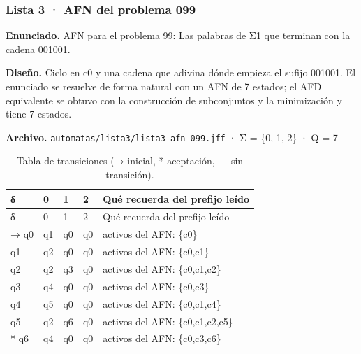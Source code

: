 
\hypertarget{lista-3-afn-del-problema-099}{%
\subsubsection{Lista 3 · AFN del problema 099}\label{lista-3-afn-del-problema-099}}

\textbf{Enunciado.} AFN para el problema 99: Las palabras de Σ1 que terminan con la cadena 001001.

\textbf{Diseño.} Ciclo en c0 y una cadena que adivina dónde empieza el sufijo 001001. El enunciado se resuelve de forma natural con un AFN de 7 estados; el AFD equivalente se obtuvo con la construcción de subconjuntos y la minimización y tiene 7 estados.

\textbf{Archivo.} \texttt{automatas/lista3/lista3-afn-099.jff} · Σ = \{0, 1, 2\} · \textbar Q\textbar{} = 7

\begin{longtable}[]{@{}lllll@{}}
\caption{Tabla de transiciones (→ inicial, * aceptación, --- sin transición).}\tabularnewline
\toprule\noalign{}
δ & 0 & 1 & 2 & Qué recuerda del prefijo leído \\
\midrule\noalign{}
\endfirsthead
\toprule\noalign{}
δ & 0 & 1 & 2 & Qué recuerda del prefijo leído \\
\midrule\noalign{}
\endhead
\bottomrule\noalign{}
\endlastfoot
→ q0 & q1 & q0 & q0 & activos del AFN: \{c0\} \\
q1 & q2 & q0 & q0 & activos del AFN: \{c0,c1\} \\
q2 & q2 & q3 & q0 & activos del AFN: \{c0,c1,c2\} \\
q3 & q4 & q0 & q0 & activos del AFN: \{c0,c3\} \\
q4 & q5 & q0 & q0 & activos del AFN: \{c0,c1,c4\} \\
q5 & q2 & q6 & q0 & activos del AFN: \{c0,c1,c2,c5\} \\
* q6 & q4 & q0 & q0 & activos del AFN: \{c0,c3,c6\} \\
\end{longtable}

